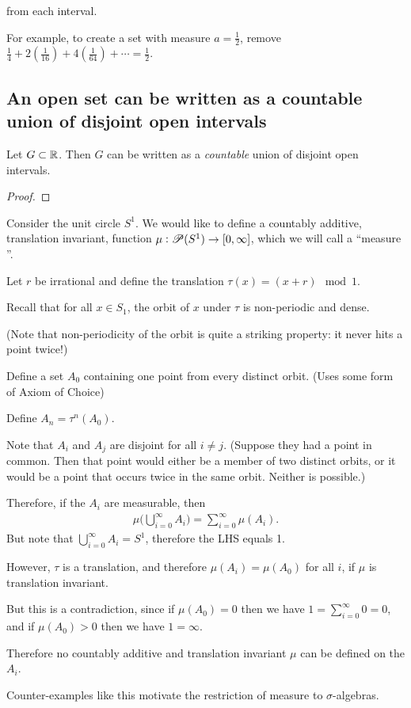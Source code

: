     from each interval.

    For example, to create a set with measure $a = \frac{1}{2}$,
    remove $\frac{1}{4} + 2(\frac{1}{16}) + 4(\frac{1}{64}) + \cdots = \frac{1}{2}$.


\subsection{An open set can be written as a countable union of disjoint open intervals}

\begin{theorem}
  Let $G \subset \mathbb{R}$. Then $G$ can be written as a {\it countable} union of disjoint open intervals.
\end{theorem}

\begin{proof}

\end{proof}

\begin{example}
  Consider the unit circle $S^1$. We would like to define a countably additive, translation invariant,
  function $\mu:\mathscr{P}(S^1) \to [0, \infty]$, which we will call a ``measure​''.

  Let $r$ be irrational and define the translation $\tau(x) = (x + r) \mod 1$.

  Recall that for all $x \in S_1$, the orbit of $x$ under $\tau$ is non-periodic and dense.

  (Note that non-periodicity of the orbit is quite a striking property: it never hits a point twice!)

  Define a set $A_0$ containing one point from every distinct orbit. (Uses some form of Axiom of Choice)

  Define $A_n = \tau^n(A_0)$.

  Note that $A_i$ and $A_j$ are disjoint for all $i \neq j$. (Suppose they had a point in common. Then that
  point would either be a member of two distinct orbits, or it would be a point that occurs twice in the same
  orbit. Neither is possible.)

  Therefore, if the $A_i$ are measurable, then
  \begin{align*}
    \mu\Big(\bigcup_{i=0}^\infty A_i\Big) = \sum_{i=0}^\infty \mu(A_i).
  \end{align*}
  But note that $\bigcup_{i=0}^\infty A_i = S^1$, therefore the LHS equals 1.

  However, $\tau$ is a translation, and therefore $\mu(A_i) = \mu(A_0)$ for all $i$, if $\mu$ is translation
  invariant.

  But this is a contradiction, since if $\mu(A_0) = 0$ then we have $1 = \sum_{i=0}^\infty 0 = 0$, and
  if $\mu(A_0) > 0$ then we have $1 = \infty$.

  Therefore no countably additive and translation invariant $\mu$ can be defined on the $A_i$.

  Counter-examples like this motivate the restriction of measure to $\sigma$-algebras.
\end{example}


